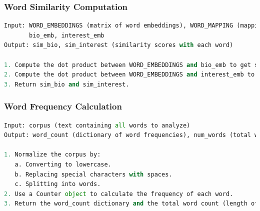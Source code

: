 \documentclass{article}
\begin{document}
\subsubsection{Word Similarity Computation}
\begin{lstlisting}[language=Python]
Input: WORD_EMBEDDINGS (matrix of word embeddings), WORD_MAPPING (mapping of words to indices), 
       bio_emb, interest_emb
Output: sim_bio, sim_interest (similarity scores with each word)

1. Compute the dot product between WORD_EMBEDDINGS and bio_emb to get sim_bio.
2. Compute the dot product between WORD_EMBEDDINGS and interest_emb to get sim_interest.
3. Return sim_bio and sim_interest.
\end{lstlisting}

\subsubsection{Word Frequency Calculation}
\begin{lstlisting}[language=Python]
Input: corpus (text containing all words to analyze)
Output: word_count (dictionary of word frequencies), num_words (total words in corpus)

1. Normalize the corpus by:
   a. Converting to lowercase.
   b. Replacing special characters with spaces.
   c. Splitting into words.
2. Use a Counter object to calculate the frequency of each word.
3. Return the word_count dictionary and the total word count (length of the word list).
\end{lstlisting}
\end{document}
